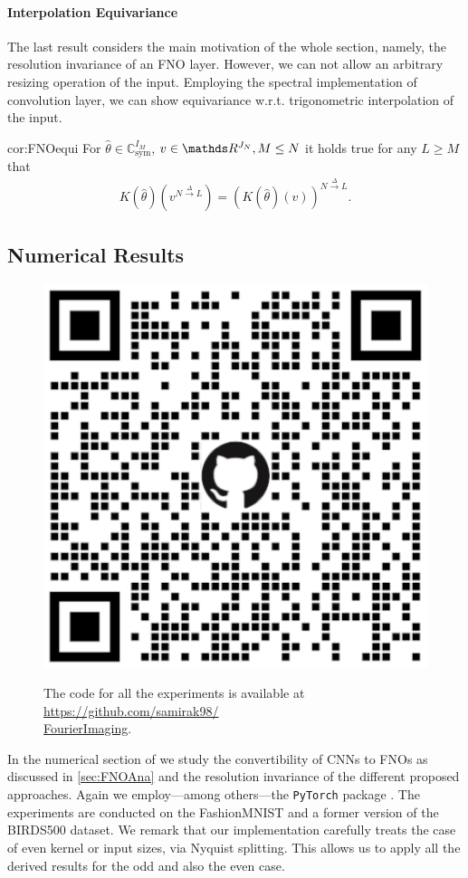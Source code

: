 \paragraph{Interpolation Equivariance}
%
%
The last result considers the main motivation of the whole section, namely, the resolution invariance of an FNO layer. However, we can not allow an arbitrary resizing operation of the input. Employing the spectral implementation of convolution layer, we can show equivariance w.r.t. trigonometric interpolation of the input.
%
%
\begin{corollary}{}{cor:FNOequi}
	For $\hat{\theta} \in \mathbb{C}^{I_M}_{\text{sym}}$, $v \in \R^{J_N}, M \leq N$ it holds true for any $L \geq M$ that
	\begin{align*}
		K(\hat{\theta})(v^{N \xrightarrow{\Delta} L}) = \left( K(\hat{\theta})(v) \right)^{N \xrightarrow{\Delta} L}.
	\end{align*}
\end{corollary}


\subsection{Numerical Results}\label{sec:FNONum}
%
%
\begin{figure}
\begin{center}
	\includegraphics[width=.4\textwidth]{atelier/FNO/FNOQR.png}
\end{center}
The code for all the experiments is available at \href{https://github.com/samirak98/FourierImaging}{https://github.com/samirak98/}\\
\href{https://github.com/samirak98/FourierImaging}{FourierImaging}.
\end{figure}
%
%
In the numerical section of \cite{kabri2023resolution} we study the convertibility of CNNs to FNOs as discussed in \cref{sec:FNOAna} and the resolution invariance of the different proposed approaches. Again we employ---among others---the \texttt{PyTorch} package \cite{paszke2019pytorch}. The experiments are conducted on the FashionMNIST \cite{Han17} and a former version of the BIRDS500 \cite{pio450} dataset. We remark that our implementation carefully treats the case of even kernel or input sizes, via Nyquist splitting. This allows us to apply all the derived results for the odd and also the even case.
%
%
